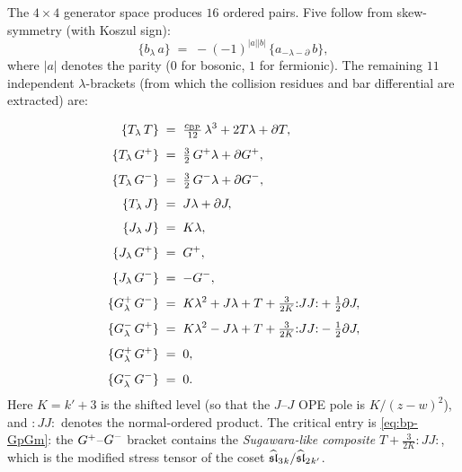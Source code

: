 \begin{computation}[The ordered bar complex of the
Bershadsky--Polyakov algebra
$\mathcal{B}^{k'} = W_{k'}(\mathfrak{sl}_3,f_{\min})$;
\ClaimStatusProvedHere]
The $4\times 4$ generator space produces $16$ ordered pairs.
Five follow from skew-symmetry (with Koszul sign):
\begin{equation}\label{eq:bp-skew-symmetry}
\{b_\lambda\, a\}
\;=\;
-(-1)^{|a||b|}\,\{a_{-\lambda-\partial}\,b\},
\end{equation}
where $|a|$ denotes the parity ($0$ for bosonic, $1$ for
fermionic). The remaining $11$ independent $\lambda$-brackets
(from which the collision residues and bar differential are
extracted) are:

\begin{align}
\{T_\lambda\, T\}
&\;=\;
\tfrac{c_{\mathrm{BP}}}{12}\,\lambda^3
+ 2T\lambda + \partial T,
\label{eq:bp-TT}
\\[4pt]
\{T_\lambda\, G^+\}
&\;=\;
\tfrac{3}{2}\,G^+\lambda + \partial G^+,
\label{eq:bp-TGp}
\\[4pt]
\{T_\lambda\, G^-\}
&\;=\;
\tfrac{3}{2}\,G^-\lambda + \partial G^-,
\label{eq:bp-TGm}
\\[4pt]
\{T_\lambda\, J\}
&\;=\;
J\lambda + \partial J,
\label{eq:bp-TJ}
\\[4pt]
\{J_\lambda\, J\}
&\;=\;
K\lambda,
\label{eq:bp-JJ}
\\[4pt]
\{J_\lambda\, G^+\}
&\;=\;
G^+,
\label{eq:bp-JGp}
\\[4pt]
\{J_\lambda\, G^-\}
&\;=\;
-G^-,
\label{eq:bp-JGm}
\\[4pt]
\{G^+_\lambda\, G^-\}
&\;=\;
K\lambda^2 + J\lambda
+ T + \tfrac{3}{2K}{:}JJ{:} + \tfrac{1}{2}\partial J,
\label{eq:bp-GpGm}
\\[4pt]
\{G^-_\lambda\, G^+\}
&\;=\;
K\lambda^2 - J\lambda
+ T + \tfrac{3}{2K}{:}JJ{:} - \tfrac{1}{2}\partial J,
\label{eq:bp-GmGp}
\\[4pt]
\{G^+_\lambda\, G^+\}
&\;=\; 0,
\label{eq:bp-GpGp}
\\[4pt]
\{G^-_\lambda\, G^-\}
&\;=\; 0.
\label{eq:bp-GmGm}
\end{align}
Here $K=k'+3$ is the shifted level
(so that the $J$--$J$ OPE pole is $K/(z-w)^2$),
and ${:}JJ{:}$ denotes the normal-ordered product.
The critical entry is
\eqref{eq:bp-GpGm}:
the $G^+$--$G^-$ bracket contains the
\emph{Sugawara-like composite} $T+\frac{3}{2K}{:}JJ{:}$, which
is the modified stress tensor of the coset
$\widehat{\mathfrak{sl}}_3{}_k / \widehat{\mathfrak{sl}}_2{}_{k'}$.


\end{computation}
